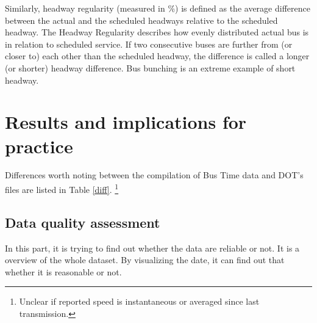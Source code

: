 \documentclass[12pt]{report}
\begin{document}
Similarly, headway regularity (measured in \%) is defined as the average difference between the actual and the scheduled headways relative to the scheduled headway. The Headway Regularity describes how evenly distributed actual bus is in relation to scheduled service. If two consecutive buses are further from (or closer to) each other than the scheduled headway, the difference is called a longer (or shorter) headway difference. Bus bunching is an extreme example of short headway.

\newpage

\section{Results and implications for practice}

Differences worth noting between the compilation of Bus Time data and DOT's files are listed in Table \ref{diff}. \footnote{Unclear if reported speed is instantaneous or averaged since last transmission.}

\vspace{0.5cm}









 

\subsection{Data quality assessment}


 In this part, it is trying to find out whether the data are reliable or not. It is a overview of the whole dataset. By visualizing the date, it can find out that whether it is reasonable or not.
 
\end{document}
